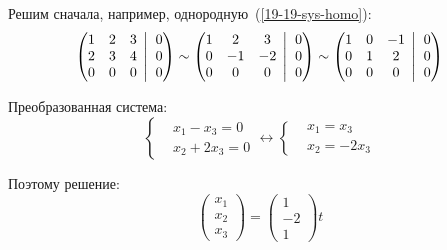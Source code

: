 \documentclass[a4paper,12pt]{article}
\newcommand{\BigMiddleThree}{\;\left|\vphantom{\begin{pmatrix} 0\\0\\0 \end{pmatrix}}\right.\;}
\begin{document}
\begin{solution}
    Решим сначала, например, однородную~(\ref{19-19-sys-homo}):
    \[
      \left(
        \begin{matrix}
          1 & 2 & 3\\
          2 & 3 & 4\\
          0 & 0 & 0
        \end{matrix}
        \BigMiddleThree
        \begin{matrix}
          0\\
          0\\
          0
        \end{matrix}
      \right)
      \sim \left(
        \begin{matrix}
          1 & 2 & 3\\
          0 & -1 & -2\\
          0 & 0 & 0
        \end{matrix}
        \BigMiddleThree
        \begin{matrix}
          0\\
          0\\
          0
        \end{matrix}
      \right)
      \sim \left(
        \begin{matrix}
          1 & 0 & -1\\
          0 & 1 & 2\\
          0 & 0 & 0
        \end{matrix}
        \BigMiddleThree
        \begin{matrix}
          0\\
          0\\
          0
        \end{matrix}
      \right)
    \]
    
    Преобразованная система:
    \[
      \left\{
        \begin{aligned}
          &x_1 - x_3 = 0\\
          &x_2 + 2x_3 = 0
        \end{aligned}
      \right.
      \leftrightarrow
      \left\{
        \begin{aligned}
          &x_1 = x_3\\
          &x_2 = -2x_3
        \end{aligned}
      \right.
    \]

    Поэтому решение:
    \[
      \begin{pmatrix}
        x_1\\
        x_2\\
        x_3
      \end{pmatrix} = \begin{pmatrix}
        1\\
        -2\\
        1
      \end{pmatrix} t
    \]


\end{solution}
\end{document}
